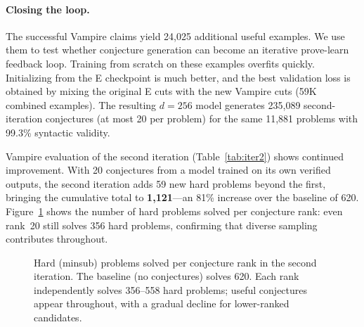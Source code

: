 \documentclass{easychair}
\newcommand{\Eprover}{E\xspace}
\newcommand{\Vampire}{Vampire\xspace}
\begin{document}
\paragraph{Closing the loop.}
The successful \Vampire claims yield 24,025 additional useful examples.
We use them to test whether conjecture generation can become an
iterative prove-learn feedback loop.  Training from scratch on these examples
overfits quickly.  Initializing from the \Eprover checkpoint is much
better, and the best validation loss is obtained by mixing the original
\Eprover cuts with the new \Vampire cuts (59K combined examples).
The resulting $d{=}256$ model generates 235,089 second-iteration
conjectures (at most 20 per problem) for the same 11,881 problems with
99.3\% syntactic validity.

\Vampire evaluation of the second iteration (Table~\ref{tab:iter2})
shows continued improvement.  With 20 conjectures from a model
trained on its own verified outputs, the second iteration adds 59
new hard problems beyond the first, bringing the cumulative total
to \textbf{1,121}---an 81\% increase over the baseline of 620.
Figure~\ref{fig:iter2rank} shows the number of hard problems solved
per conjecture rank: even rank~20 still solves 356 hard problems,
confirming that diverse sampling contributes throughout.

\begin{figure}[t]
\centering
{}
\caption{Hard (minsub) problems solved per conjecture rank in the
  second iteration.  The baseline (no conjectures) solves 620.
  Each rank independently solves 356--558 hard problems; useful
  conjectures appear throughout, with a gradual decline for
  lower-ranked candidates.}
\label{fig:iter2rank}
\end{figure}
\end{document}

